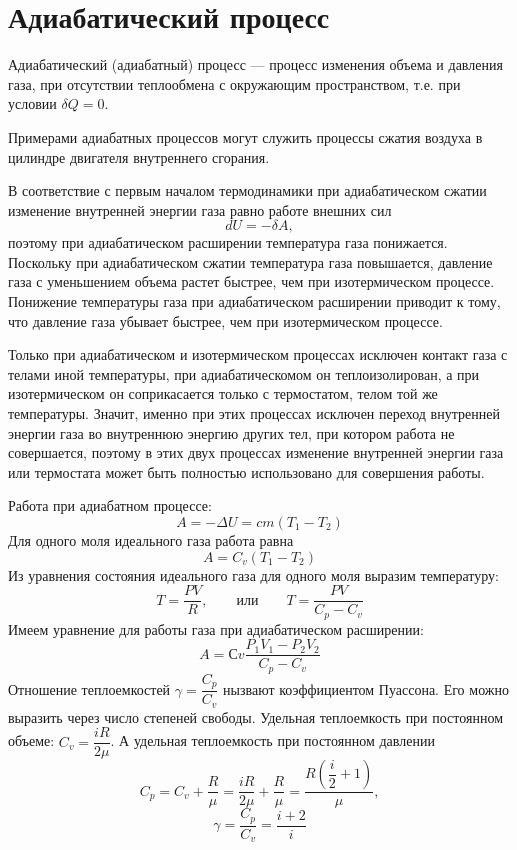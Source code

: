 \section{Адиабатический процесс}	

	\begin{defn}
		Адиабатический (адиабатный) процесс --- процесс изменения объема и давления газа, при отсутствии теплообмена с окружающим пространством, т.е. при условии $\delta Q=0$.
	\end{defn}
	Примерами адиабатных процессов могут служить процессы сжатия воздуха в цилиндре двигателя внутреннего сгорания.\par
	В соответствие с первым началом термодинамики при адиабатическом сжатии изменение внутренней энергии газа равно работе внешних сил
		$$dU = -\delta A,$$
	поэтому при адиабатическом расширении температура газа понижается. 	Поскольку при адиабатическом сжатии температура газа повышается, давление газа с уменьшением объема растет быстрее, чем при изотермическом процессе. Понижение температуры газа при адиабатическом расширении приводит к тому, что давление газа убывает быстрее, чем при изотермическом процессе.\par
	Только при адиабатическом и изотермическом процессах исключен контакт газа с телами иной температуры, при адиабатическомом он теплоизолирован, а при изотермическом он соприкасается только с термостатом, телом той же температуры. Значит, именно при этих процессах исключен переход внутренней энергии газа во внутреннюю энергию других тел, при котором работа не совершается, поэтому в этих двух процессах изменение внутренней энергии газа или термостата может быть полностью использовано для совершения работы.\par
	Работа при адиабатном процессе:
		$$A = -\Delta U = cm(T_1-T_2)$$
   	Для одного моля идеального газа работа равна 									            
    	$$A = C_v(T_1-T_2)$$
	Из уравнения состояния идеального газа для одного моля выразим температуру: 
		$$T = \frac{PV}{R}, \qquad \text{или} \qquad T = \frac{PV}{C_p-C_v}$$
	Имеем уравнение для работы газа при адиабатическом расширении: 
		$$A = Сv \frac{P_1V_1-P_2V_2}{C_p-C_v}$$
	Отношение теплоемкостей $\gamma = \dfrac{C_p}{C_v}$ нызвают коэффициентом Пуассона. Его можно выразить через число степеней свободы. Удельная теплоемкость при постоянном объеме: $C_v = \dfrac{iR}{2\mu}$. А удельная теплоемкость при постоянном давлении
		$$C_p = C_v + \frac{R}{\mu} = \frac{iR}{2\mu}+\frac{R}{\mu}  = \frac{R(\dfrac{i}{2}+1)}{\mu} ,$$
		$$\gamma = \frac{C_p}{C_v} = \frac{i+2}{i}$$
